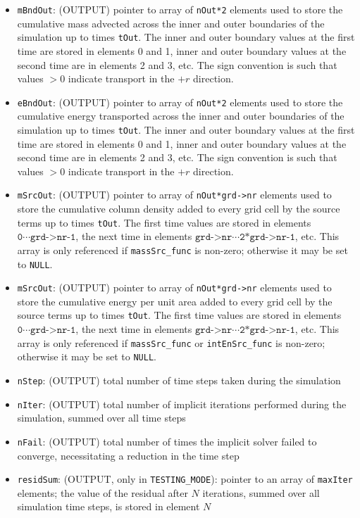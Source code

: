 \documentclass[12pt]{article}
\begin{document}
\begin{itemize}
\item \texttt{mBndOut}: (OUTPUT) pointer to array of \verb=nOut*2= elements used to store the cumulative mass advected across the inner and outer boundaries of the simulation up to times \verb=tOut=. The inner and outer boundary values at the first time are stored in elements 0 and 1, inner and outer boundary values at the second time are in elements 2 and 3, etc. The sign convention is such that values $>0$ indicate transport in the $+r$ direction.
\item \texttt{eBndOut}: (OUTPUT) pointer to array of \verb=nOut*2= elements used to store the cumulative energy transported across the inner and outer boundaries of the simulation up to times \verb=tOut=. The inner and outer boundary values at the first time are stored in elements 0 and 1, inner and outer boundary values at the second time are in elements 2 and 3, etc. The sign convention is such that values $>0$ indicate transport in the $+r$ direction.
\item \texttt{mSrcOut}: (OUTPUT) pointer to array of \verb=nOut*grd->nr= elements used to store the cumulative column density added to every grid cell by the source terms up to times \verb=tOut=. The first time values are stored in elements $\texttt{0}\cdots\texttt{grd->nr-1}$, the next time in elements $\texttt{grd->nr}\cdots\texttt{2*grd->nr-1}$, etc. This array is only referenced if \verb=massSrc_func= is non-zero; otherwise it may be set to \verb=NULL=.
\item \texttt{mSrcOut}: (OUTPUT) pointer to array of \verb=nOut*grd->nr= elements used to store the cumulative energy per unit area added to every grid cell by the source terms up to times \verb=tOut=. The first time values are stored in elements $\texttt{0}\cdots\texttt{grd->nr-1}$, the next time in elements $\texttt{grd->nr}\cdots\texttt{2*grd->nr-1}$, etc. This array is only referenced if \verb=massSrc_func= or \verb=intEnSrc_func= is non-zero; otherwise it may be set to \verb=NULL=.
\item \texttt{nStep}: (OUTPUT) total number of time steps taken during the simulation
\item \texttt{nIter}: (OUTPUT) total number of implicit iterations performed during the simulation, summed over all time steps
\item \texttt{nFail}: (OUTPUT) total number of times the implicit solver failed to converge, necessitating a reduction in the time step
\item \texttt{residSum}: (OUTPUT, only in \verb=TESTING_MODE=): pointer to an array of \texttt{maxIter} elements; the value of the residual after $N$ iterations, summed over all simulation time steps, is stored in element $N$

\end{itemize}
\end{document}

